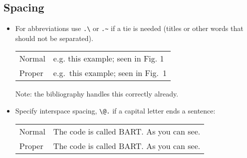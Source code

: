 \documentclass[10pt, letter]{article}
\begin{document}
\subsection{Spacing}
\begin{itemize}
\item For abbreviations use \verb|.\| or \verb|.~| if a tie is needed
  (titles or other words that should not be separated).
  \begin{center}
    \begin{tabular}[h!]{ll}
      Normal & e.g. this example; seen in Fig. 1 \\
      Proper & e.g.\ this example; seen in Fig.~1
    \end{tabular}
  \end{center}
  Note: the bibliography handles this correctly already.
\item Specify interspace spacing, \verb|\@.| if a capital letter ends
  a sentence:
    \begin{center}
    \begin{tabular}[h!]{ll} 
      Normal & The code is called BART. As you can see. \\
      Proper & The code is called BART\@. As you can see.
    \end{tabular}
  \end{center}
\end{itemize}  
\end{document}
